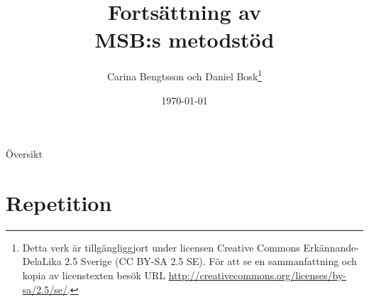 \documentclass{beamer}
\title[Intro infosäk]{%
  Fortsättning av\\
  MSB:s metodstöd
}
\author{Carina Bengtsson och Daniel Bosk\footnote{%
  Detta verk är tillgängliggjort under licensen Creative Commons 
  Erkännande-DelaLika 2.5 Sverige (CC BY-SA 2.5 SE).
	För att se en sammanfattning och kopia av licenstexten besök URL 
	\url{http://creativecommons.org/licenses/by-sa/2.5/se/}.
}}
\institute[MIUN ITM]{%
  Avdelningen för informations- och kommunikationssytem (IKS),\\
	Institutionen för informationsteknologi och medier (ITM),\\
	Mittuniversitetet, Sundsvall.
}
\date{\today}
\begin{document}
\begin{frame}
  \titlepage{}
\end{frame}

\begin{frame}{Översikt}
  \begin{multicols}{2}
    \tableofcontents
  \end{multicols}
\end{frame}




\section{Repetition}
\end{document}

